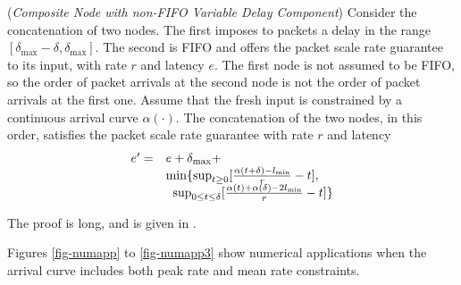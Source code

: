 \begin{theorem}(\emph{Composite Node with non-FIFO Variable Delay
Component})  Consider the concatenation of
two nodes. The first imposes to packets a delay in the range
$[\delta_{\max}-\delta, \delta_{\max}]$. The second is FIFO
and offers the packet scale rate guarantee to its input, with
rate $r$ and latency $e$. The first node is not assumed to be
FIFO, so the order of packet arrivals at the second node is
not the order of packet arrivals at the first one. Assume that
the fresh input is constrained by a continuous arrival curve
$\alpha(\cdot)$. The concatenation of the two nodes, in this
order,  satisfies the packet scale rate guarantee with rate
$r$ and latency
\begin{equation}\mylabel{eq-theonfvd}
  \begin{array}{rl}
    e'=&  e+ \delta_{\max} +  \\
    & \min \{
  \sup_{t \geq 0}[ \frac{\alpha(t+ \delta) - l_{\min}}{r}- t], \\
    & \; \; \sup_{0 \leq t \leq \delta}
  [ \frac{\alpha(t)+ \alpha(\delta) -
2 l_{\min}}{r}- t] \}
  \end{array}
\end{equation}
\end{theorem}
The proof is long, and is given in .

Figures \ref{fig-numapp} to \ref{fig-numapp3} show numerical
applications when the arrival curve includes both peak rate
and mean rate constraints.

